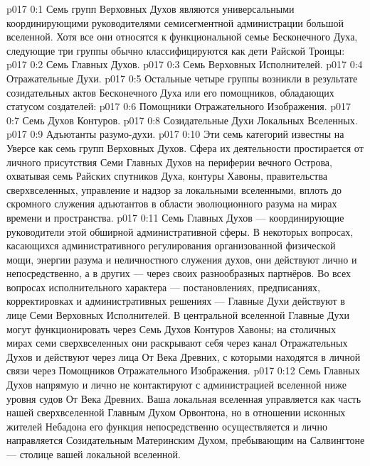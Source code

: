 \author{Божественный Советник}
\vs p017 0:1 Семь групп Верховных Духов являются универсальными координирующими руководителями семисегментной администрации большой вселенной. Хотя все они относятся к функциональной семье Бесконечного Духа, следующие три группы обычно классифицируются как дети Райской Троицы:
\vs p017 0:2 Семь Главных Духов.
\vs p017 0:3 Семь Верховных Исполнителей.
\vs p017 0:4 Отражательные Духи.
\vs p017 0:5 \pc Остальные четыре группы возникли в результате созидательных актов Бесконечного Духа или его помощников, обладающих статусом создателей:
\vs p017 0:6 Помощники Отражательного Изображения.
\vs p017 0:7 Семь Духов Контуров.
\vs p017 0:8 Созидательные Духи Локальных Вселенных.
\vs p017 0:9 Адъютанты разумо\hyp{}духи.
\vs p017 0:10 \pc Эти семь категорий известны на Уверсе как семь групп Верховных Духов. Сфера их деятельности простирается от личного присутствия Семи Главных Духов на периферии вечного Острова, охватывая семь Райских спутников Духа, контуры Хавоны, правительства сверхвселенных, управление и надзор за локальными вселенными, вплоть до скромного служения адъютантов в области эволюционного разума на мирах времени и пространства.
\vs p017 0:11 Семь Главных Духов --- координирующие руководители этой обширной административной сферы. В некоторых вопросах, касающихся административного регулирования организованной физической мощи, энергии разума и неличностного служения духов, они действуют лично и непосредственно, а в других --- через своих разнообразных партнёров. Во всех вопросах исполнительного характера --- постановлениях, предписаниях, корректировках и административных решениях --- Главные Духи действуют в лице Семи Верховных Исполнителей. В центральной вселенной Главные Духи могут функционировать через Семь Духов Контуров Хавоны; на столичных мирах семи сверхвселенных они раскрывают себя через канал Отражательных Духов и действуют через лица От Века Древних, с которыми находятся в личной связи через Помощников Отражательного Изображения.
\vs p017 0:12 Семь Главных Духов напрямую и лично не контактируют с администрацией вселенной ниже уровня судов От Века Древних. Ваша локальная вселенная управляется как часть нашей сверхвселенной Главным Духом Орвонтона, но в отношении исконных жителей Небадона его функция непосредственно осуществляется и лично направляется Созидательным Материнским Духом, пребывающим на Салвингтоне --- столице вашей локальной вселенной.
